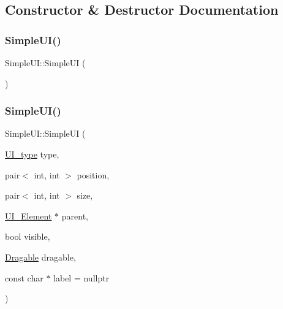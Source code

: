 \subsection{Constructor \& Destructor Documentation}
\mbox{\label{class_simple_u_i_a4375856e165bd5c4721921f1d5714f65}} 
\subsubsection{\texorpdfstring{SimpleUI()}{SimpleUI()}\hspace{0.1cm}{\footnotesize\ttfamily [1/2]}}
{\footnotesize\ttfamily Simple\+U\+I\+::\+Simple\+UI (\begin{DoxyParamCaption}{ }\end{DoxyParamCaption})}

\mbox{\label{class_simple_u_i_a372da94e2ebeb6b4fc36617bf620a3a4}} 
\subsubsection{\texorpdfstring{SimpleUI()}{SimpleUI()}\hspace{0.1cm}{\footnotesize\ttfamily [2/2]}}
{\footnotesize\ttfamily Simple\+U\+I\+::\+Simple\+UI (\begin{DoxyParamCaption}\item[{\mbox{\hyperlink{class_u_i___element_a7ed595c46c75d53d30fa3813b036cf1e}{U\+I\+\_\+type}}}]{type,  }\item[{pair$<$ int, int $>$}]{position,  }\item[{pair$<$ int, int $>$}]{size,  }\item[{\mbox{\hyperlink{class_u_i___element}{U\+I\+\_\+\+Element}} $\ast$}]{parent,  }\item[{bool}]{visible,  }\item[{\mbox{\hyperlink{struct_dragable}{Dragable}}}]{dragable,  }\item[{const char $\ast$}]{label = {\ttfamily nullptr} }\end{DoxyParamCaption})}

\mbox{\label{class_simple_u_i_a95cfaa895ce80b4ddbdfc2bd57f8f83b}} 
